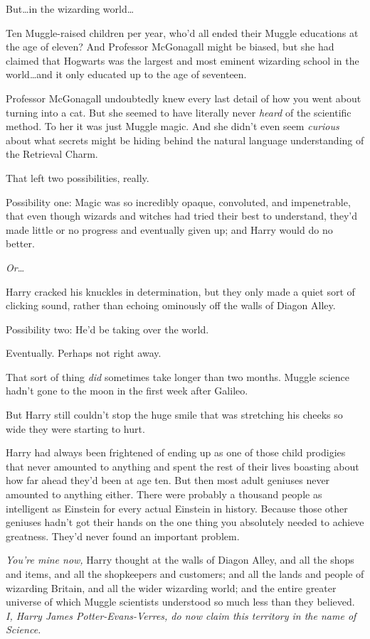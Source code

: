 But…in the wizarding world…

Ten Muggle-raised children per year, who'd all ended their Muggle educations at the age of eleven? And Professor McGonagall might be biased, but she had claimed that Hogwarts was the largest and most eminent wizarding school in the world…and it only educated up to the age of seventeen.

Professor McGonagall undoubtedly knew every last detail of how you went about turning into a cat. But she seemed to have literally never \emph{heard} of the scientific method. To her it was just Muggle magic. And she didn't even seem \emph{curious} about what secrets might be hiding behind the natural language understanding of the Retrieval Charm.

That left two possibilities, really.

Possibility one: Magic was so incredibly opaque, convoluted, and impenetrable, that even though wizards and witches had tried their best to understand, they'd made little or no progress and eventually given up; and Harry would do no better.

\emph{Or}…

Harry cracked his knuckles in determination, but they only made a quiet sort of clicking sound, rather than echoing ominously off the walls of Diagon Alley.

Possibility two: He'd be taking over the world.

Eventually. Perhaps not right away.

That sort of thing \emph{did} sometimes take longer than two months. Muggle science hadn't gone to the moon in the first week after Galileo.

But Harry still couldn't stop the huge smile that was stretching his cheeks so wide they were starting to hurt.

Harry had always been frightened of ending up as one of those child prodigies that never amounted to anything and spent the rest of their lives boasting about how far ahead they'd been at age ten. But then most adult geniuses never amounted to anything either. There were probably a thousand people as intelligent as Einstein for every actual Einstein in history. Because those other geniuses hadn't got their hands on the one thing you absolutely needed to achieve greatness. They'd never found an important problem.

\emph{You're mine now,} Harry thought at the walls of Diagon Alley, and all the shops and items, and all the shopkeepers and customers; and all the lands and people of wizarding Britain, and all the wider wizarding world; and the entire greater universe of which Muggle scientists understood so much less than they believed. \emph{I, Harry James Potter-Evans-Verres, do now claim this territory in the name of Science.}

